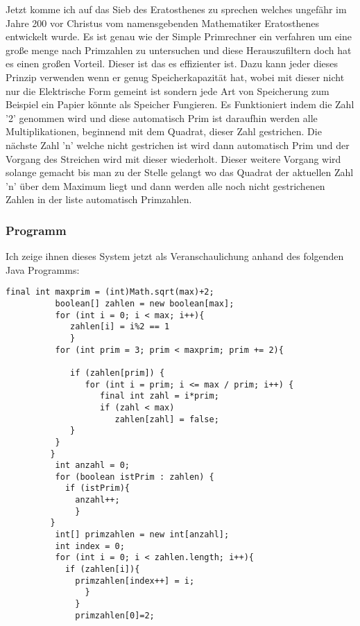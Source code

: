 Jetzt komme ich auf das Sieb des Eratosthenes zu sprechen welches ungefähr im Jahre 200 vor Christus vom namensgebenden Mathematiker Eratosthenes entwickelt wurde. Es ist genau wie der Simple Primrechner ein verfahren um eine große menge nach Primzahlen zu untersuchen und diese Herauszufiltern doch hat es einen großen Vorteil. Dieser ist das es effizienter ist. Dazu kann jeder dieses Prinzip verwenden wenn er genug Speicherkapazität hat, wobei mit dieser nicht nur die Elektrische Form gemeint ist sondern jede Art von Speicherung zum Beispiel ein Papier könnte als Speicher Fungieren. Es Funktioniert indem die Zahl '2' genommen wird und diese automatisch Prim ist daraufhin werden alle Multiplikationen, beginnend mit dem Quadrat, dieser Zahl gestrichen. Die nächste Zahl 'n' welche nicht gestrichen ist wird dann automatisch Prim und der Vorgang des Streichen wird mit dieser wiederholt. Dieser weitere Vorgang wird solange gemacht bis man zu der Stelle gelangt wo das Quadrat der aktuellen Zahl 'n' über dem Maximum liegt und dann werden alle noch nicht gestrichenen Zahlen in der liste automatisch Primzahlen.
\subsubsection{Programm}
Ich zeige ihnen dieses System jetzt als Veranschaulichung anhand des folgenden Java Programms:
\lstset{language=Java} 
\begin{lstlisting}[frame=single]
  final int maxprim = (int)Math.sqrt(max)+2;
	      boolean[] zahlen = new boolean[max];
	      for (int i = 0; i < max; i++){
	         zahlen[i] = i%2 == 1	    
	         }  
	      for (int prim = 3; prim < maxprim; prim += 2){

	         if (zahlen[prim]) { 
	            for (int i = prim; i <= max / prim; i++) {
	               final int zahl = i*prim;
	               if (zahl < max)
	                  zahlen[zahl] = false;
	         }
	      }
	     }  
	      int anzahl = 0;
	      for (boolean istPrim : zahlen) {
	        if (istPrim){
	          anzahl++;
	          }
	     }
	      int[] primzahlen = new int[anzahl];
	      int index = 0;
	      for (int i = 0; i < zahlen.length; i++){
	        if (zahlen[i]){
	          primzahlen[index++] = i;
				}	          
	          }
	          primzahlen[0]=2;
\end{lstlisting}
